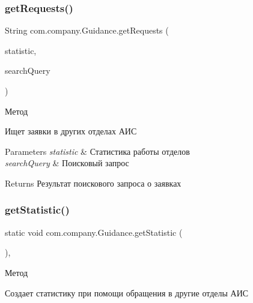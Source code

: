 \subsubsection{\texorpdfstring{get\+Requests()}{getRequests()}}
{\footnotesize\ttfamily String com.\+company.\+Guidance.\+get\+Requests (\begin{DoxyParamCaption}\item[{Array\+List}]{statistic,  }\item[{String}]{search\+Query }\end{DoxyParamCaption})\hspace{0.3cm}{\ttfamily [inline]}}



Метод 

Ищет заявки в других отделах АИС 
\begin{DoxyParams}{Parameters}
{\em statistic} & Статистика работы отделов \\
\hline
{\em search\+Query} & Поисковый запрос \\
\hline
\end{DoxyParams}
\begin{DoxyReturn}{Returns}
Результат поискового запроса о заявках 
\end{DoxyReturn}
\mbox{\label{classcom_1_1company_1_1Guidance_a9bceab5fdaf33ebf35d22523fe565f4d}} 
\subsubsection{\texorpdfstring{get\+Statistic()}{getStatistic()}}
{\footnotesize\ttfamily static void com.\+company.\+Guidance.\+get\+Statistic (\begin{DoxyParamCaption}{ }\end{DoxyParamCaption})\hspace{0.3cm}{\ttfamily [inline]}, {\ttfamily [static]}}



Метод 

Создает статистику при помощи обращения в другие отделы АИС \mbox{\label{classcom_1_1company_1_1Guidance_aa6b329f0557afeb373801df76ee960b4}} 
